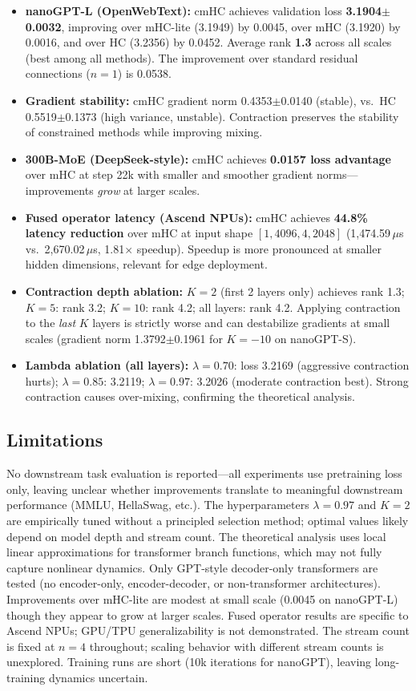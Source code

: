 \documentclass[11pt,a4paper]{article}
\begin{document}
\begin{itemize}
  \item \textbf{nanoGPT-L (OpenWebText):} cmHC achieves validation loss \textbf{3.1904$\pm$0.0032}, improving over mHC-lite (3.1949) by 0.0045, over mHC (3.1920) by 0.0016, and over HC (3.2356) by 0.0452. Average rank \textbf{1.3} across all scales (best among all methods). The improvement over standard residual connections ($n{=}1$) is 0.0538.
  \item \textbf{Gradient stability:} cmHC gradient norm 0.4353$\pm$0.0140 (stable), vs.\ HC 0.5519$\pm$0.1373 (high variance, unstable). Contraction preserves the stability of constrained methods while improving mixing.
  \item \textbf{300B-MoE (DeepSeek-style):} cmHC achieves \textbf{0.0157 loss advantage} over mHC at step 22k with smaller and smoother gradient norms---improvements \emph{grow} at larger scales.
  \item \textbf{Fused operator latency (Ascend NPUs):} cmHC achieves \textbf{44.8\% latency reduction} over mHC at input shape $[1, 4096, 4, 2048]$ (1,474.59\,$\mu$s vs.\ 2,670.02\,$\mu$s, 1.81$\times$ speedup). Speedup is more pronounced at smaller hidden dimensions, relevant for edge deployment.
  \item \textbf{Contraction depth ablation:} $K{=}2$ (first 2 layers only) achieves rank 1.3; $K{=}5$: rank 3.2; $K{=}10$: rank 4.2; all layers: rank 4.2. Applying contraction to the \emph{last} $K$ layers is strictly worse and can destabilize gradients at small scales (gradient norm 1.3792$\pm$0.1961 for $K{=}{-}10$ on nanoGPT-S).
  \item \textbf{Lambda ablation (all layers):} $\lambda{=}0.70$: loss 3.2169 (aggressive contraction hurts); $\lambda{=}0.85$: 3.2119; $\lambda{=}0.97$: 3.2026 (moderate contraction best). Strong contraction causes over-mixing, confirming the theoretical analysis.
\end{itemize}

\subsection{Limitations}
No downstream task evaluation is reported---all experiments use pretraining loss only, leaving unclear whether improvements translate to meaningful downstream performance (MMLU, HellaSwag, etc.). The hyperparameters $\lambda{=}0.97$ and $K{=}2$ are empirically tuned without a principled selection method; optimal values likely depend on model depth and stream count. The theoretical analysis uses local linear approximations for transformer branch functions, which may not fully capture nonlinear dynamics. Only GPT-style decoder-only transformers are tested (no encoder-only, encoder-decoder, or non-transformer architectures). Improvements over mHC-lite are modest at small scale (0.0045 on nanoGPT-L) though they appear to grow at larger scales. Fused operator results are specific to Ascend NPUs; GPU/TPU generalizability is not demonstrated. The stream count is fixed at $n{=}4$ throughout; scaling behavior with different stream counts is unexplored. Training runs are short (10k iterations for nanoGPT), leaving long-training dynamics uncertain.
\end{document}
